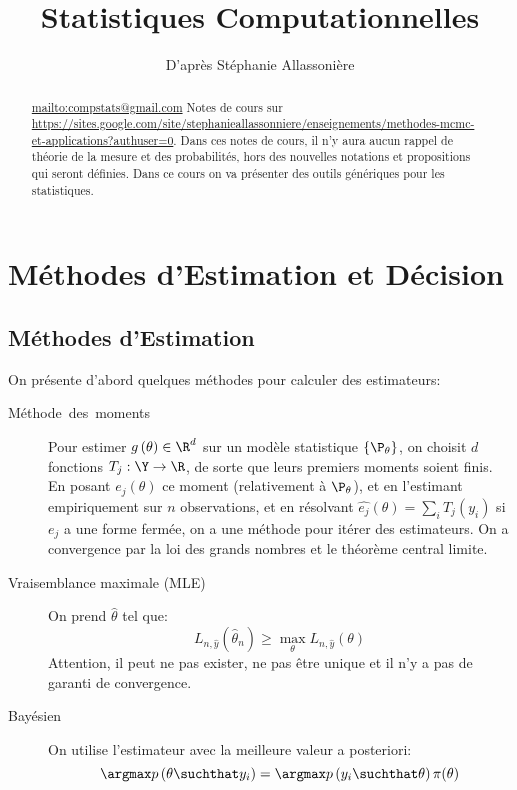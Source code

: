 \documentclass[info, math, french]{mpb-cours}
\title{Statistiques Computationnelles}
\author{D'après Stéphanie Allassonière}
\def\model#1#2{p\left(#1\suchthat#2\right)}
\def\that{\hat{\theta}}
\begin{document}
\bettertitle
\begin{abstract}
	\url{mailto:compstats@gmail.com}
	Notes de cours sur \url{https://sites.google.com/site/stephanieallassonniere/enseignements/methodes-mcmc-et-applications?authuser=0}.
	Dans ces notes de cours, il n'y aura aucun rappel de théorie de la mesure et des probabilités,
	hors des nouvelles notations et propositions qui seront définies.
	Dans ce cours on va présenter des outils génériques pour les statistiques.
\end{abstract}

\section{Méthodes d'Estimation et Décision}
\subsection{Méthodes d'Estimation}
On présente d'abord quelques méthodes pour calculer des estimateurs:
\begin{description}
	\item[Méthode~des~moments] Pour estimer $g\left(\theta\right) \in \R^{d}$ sur un modèle statistique $\left\{ \P_{\theta} \right\}$, on choisit $d$ fonctions $T_{j}: \Y \to \R$, de sorte que leurs premiers moments soient finis.
	      En posant $e_{j}(\theta)$ ce moment (relativement à $\P_{\theta}$), et en l'estimant empiriquement sur $n$ observations,
	      et en résolvant $\hat{e_{j}}\left(\theta\right) = \sum_{i} T_{j}\left(y_{i}\right)$ si $e_{j}$ a une forme fermée, on a une méthode pour itérer des estimateurs.
	      On a convergence par la loi des grands nombres et le théorème central limite.
	\item[Vraisemblance maximale (MLE)] On prend $\that$ tel que:
	      \begin{equation*}
		      L_{n, \hat{y}}\left(\that_{n}\right) \geq \max_{\theta} L_{n, \hat{y}}\left(\theta\right)
	      \end{equation*}
	      Attention, il peut ne pas exister, ne pas être unique et il n'y a pas de garanti de convergence.
	\item[Bayésien] On utilise l'estimateur avec la meilleure valeur a posteriori:
	      \begin{equation*}
		      \argmax \model{\theta}{y_{i}} = \argmax \model{y_{i}}{\theta}\pi(\theta)
	      \end{equation*}
\end{description}
\end{document}
